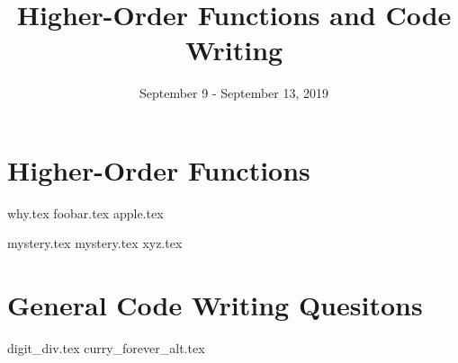 \documentclass{exam}
\title{Higher-Order Functions and Code Writing}
\date{September 9 - September 13, 2019}
\begin{document}
\maketitle

\section{Higher-Order Functions}
\begin{questions}
{why.tex}
{foobar.tex}
{apple.tex}
\clearpage

{mystery.tex}
{mystery.tex}
\clearpage
{xyz.tex}

\section{General Code Writing Quesitons}
{digit_div.tex}
{curry_forever_alt.tex}


\end{questions}
\end{document}
